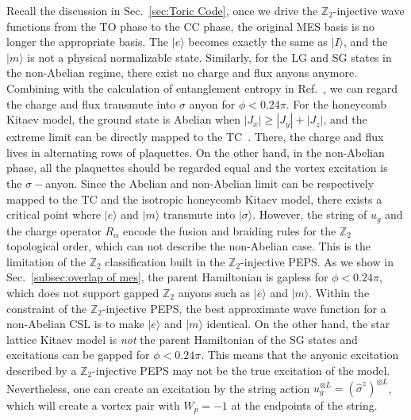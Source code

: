 \documentclass{ntuthesis}
\begin{document}
%
Recall the discussion in Sec.~\ref{sec:Toric Code}, once we drive the $\mathbb{Z}_2$-injective wave functions from the TO phase to the CC  phase, the original MES basis is no longer the appropriate basis. 
%
The $|e\rangle$ becomes  exactly the same as $|I\rangle$, and the $|m\rangle$ is not  a physical normalizable state. 
%
Similarly, for the LG and SG states in the non-Abelian regime, there exist no charge and flux anyons anymore. 
%
Combining with the calculation of entanglement entropy in Ref.~\cite{non-AbelianTO_2020}, we can  regard the charge and flux transmute into $\sigma$ anyon for $\phi < 0.24\pi$.
%
 For the honeycomb Kitaev model, the ground state is Abelian when $|J_x| \geq |J_y|+|J_z|$, and the extreme limit can be directly mapped to the TC~\cite{Kitaev2006}. 
%
There, the charge and flux lives in alternating rows of plaquettes. 
%
 On the other hand, in the non-Abelian phase, all the plaquettes should be regarded equal and the vortex excitation is the  $\sigma-$anyon.
Since the Abelian and non-Abelian limit can be respectively mapped to the TC and the isotropic  honeycomb  Kitaev model, there exists a critical point where $|e\rangle$ and $|m\rangle$ transmute into $|\sigma\rangle$.
%
However, the string of $u_g$ and the charge operator $R_\alpha$ encode the fusion and braiding rules for the $\mathbb{Z}_2$ topological order, which can not describe the  non-Abelian case. 
%
This is the limitation of the $\mathbb{Z}_2$ classification built in the $\mathbb{Z}_2$-injective PEPS.
%
As we  show in Sec.~\ref{subsec:overlap of mes}, the parent Hamiltonian is  gapless for $\phi < 0.24\pi$, which does not support gapped $\mathbb{Z}_2$ anyons such as $|e\rangle$ and $|m\rangle$.
%
Within the constraint of the  $\mathbb{Z}_2$-injective PEPS, the best approximate wave function for a non-Abelian CSL is to make $|e\rangle$ and $|m\rangle$ identical.
%
On the other hand, the   star lattice  Kitaev model is \textit{not} the parent Hamiltonian of the SG states  and  excitations can be gapped for $\phi < 0.24\pi$. 
%
This means that the anyonic excitation  described by a $\mathbb{Z}_2$-injective PEPS may not be the true excitation of the model. 
%
Nevertheless, one can create an excitation by the string action $u_g^{\otimes L} = (\hat{\sigma}^z)^{\otimes L}$, which will create a vortex pair with $W_p = -1$ at the endpoints of the string. 
%
%
%
%
%

\appendix

\backmatter
{}
{}
%
 


\end{document}
